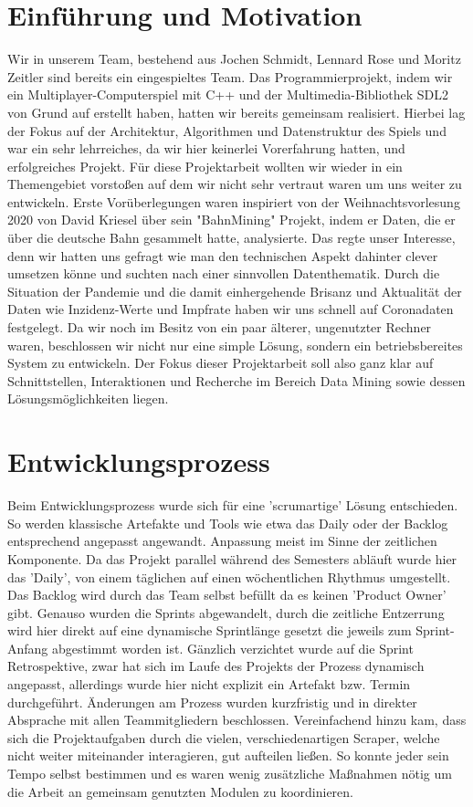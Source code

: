 \documentclass[12pt,oneside,a4paper,parskip]{scrbook}
\begin{document}
\chapter{Einführung und Motivation}\label{ch:intro}
Wir in unserem Team, bestehend aus Jochen Schmidt, Lennard Rose und Moritz Zeitler sind bereits ein eingespieltes Team. Das Programmierprojekt, indem wir ein Multiplayer-Computerspiel mit C++ und der Multimedia-Bibliothek SDL2 von Grund auf erstellt haben, hatten wir bereits gemeinsam realisiert. Hierbei lag der Fokus auf der Architektur, Algorithmen und Datenstruktur des Spiels und war ein sehr lehrreiches, da wir hier keinerlei Vorerfahrung hatten, und erfolgreiches Projekt. Für diese Projektarbeit wollten wir wieder in ein Themengebiet vorstoßen auf dem wir nicht sehr vertraut waren um uns weiter zu entwickeln. Erste Vorüberlegungen waren inspiriert von der Weihnachtsvorlesung 2020 von David Kriesel über sein "BahnMining" Projekt, indem er Daten, die er über die deutsche Bahn gesammelt hatte, analysierte. Das regte unser Interesse, denn wir hatten uns gefragt wie man den technischen Aspekt dahinter clever umsetzen könne und suchten nach einer sinnvollen Datenthematik. Durch die Situation der Pandemie und die damit einhergehende Brisanz und Aktualität der Daten wie Inzidenz-Werte und Impfrate haben wir uns schnell auf Coronadaten festgelegt. Da wir noch im Besitz von ein paar älterer, ungenutzter Rechner waren, beschlossen wir nicht nur eine simple Lösung, sondern ein betriebsbereites System zu entwickeln. \newline
Der Fokus dieser Projektarbeit soll also ganz klar auf Schnittstellen, Interaktionen und Recherche im Bereich Data Mining sowie dessen Lösungsmöglichkeiten liegen.

\chapter{Entwicklungsprozess}
Beim Entwicklungsprozess wurde sich f\"ur eine 'scrumartige' L\"osung entschieden. So werden klassische Artefakte und Tools wie etwa das Daily oder der Backlog entsprechend angepasst angewandt. Anpassung meist im Sinne der zeitlichen Komponente. Da das Projekt parallel w\"ahrend des Semesters abl\"auft wurde hier das 'Daily', von einem t\"aglichen auf einen w\"ochentlichen Rhythmus umgestellt. Das Backlog wird durch das Team selbst bef\"ullt da es keinen 'Product Owner' gibt. Genauso wurden die Sprints abgewandelt, durch die zeitliche Entzerrung wird hier direkt auf eine dynamische Sprintl\"ange gesetzt die jeweils zum Sprint-Anfang abgestimmt worden ist. \newline
G\"anzlich verzichtet wurde auf die Sprint Retrospektive, zwar hat sich im Laufe des Projekts der Prozess dynamisch angepasst, allerdings wurde hier nicht explizit ein Artefakt bzw. Termin durchgef\"uhrt. \"Anderungen am Prozess wurden kurzfristig und in direkter Absprache mit allen Teammitgliedern beschlossen. Vereinfachend hinzu kam, dass sich die Projektaufgaben durch die vielen, verschiedenartigen Scraper, welche nicht weiter miteinander interagieren, gut aufteilen ließen. So konnte jeder sein Tempo selbst bestimmen und es waren wenig zusätzliche Maßnahmen nötig um die Arbeit an gemeinsam genutzten Modulen zu koordinieren.
\end{document}
